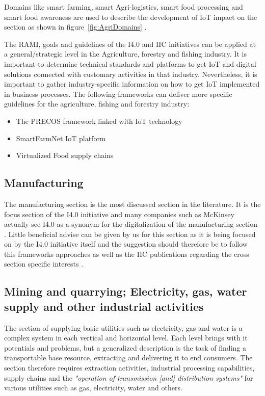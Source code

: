 Domains like smart farming, smart Agri-logistics, smart food processing and smart food awareness are used to describe the development of \ac{IoT} impact on the section as shown in figure~\ref{fig:AgriDomains} \cite[p.133]{FoodAndFarm2020}.

The \ac{RAMI}, goals and guidelines of the \ac{I4.0} and \ac{IIC} initiatives can be applied at a general/strategic level in the Agriculture, forestry and fishing industry. It is important to determine technical standards and platforms to get \ac{IoT} and digital solutions connected with customary activities in that industry. Nevertheless, it is important to gather industry-specific information on how to get \ac{IoT} implemented in business processes.
The following frameworks can deliver more specific guidelines for the agriculture, fishing and forestry industry:

\begin{itemize}
\item The PRECOS framework linked with \ac{IoT} technology \cite{Trolard2016590}
\item SmartFarmNet \ac{IoT} platform \cite{InternetOfThingsAgricultureSmartFarming}
\item Virtualized Food supply chains \cite{Verdouw2016128}
\end{itemize}


\subsection{Manufacturing}
The manufacturing section is the most discussed section in the literature. It is the focus section of the \ac{I4.0} initiative and many companies such as McKinsey actually see \ac{I4.0} as a synonym for the digitalization of the manufacturing section \cite[]{McKinseydigitizationIndustrialSector:2015}. Little beneficial advise can be given by us for this section as it is being focused on by the \ac{I4.0} initiative itself and the suggestion should therefore be to follow this frameworks approaches as well as the \ac{IIC} publications regarding the cross section specific interests \cite[]{iicarchitecture:2016}.

\subsection{Mining and quarrying; Electricity, gas, water supply and other industrial activities }

The section of supplying basic utilities such as electricity, gas and water is a complex system in each vertical and horizontal level. Each level brings with it potentials and problems, but a generalized description is the task of finding a transportable base resource, extracting and delivering it to end consumers. The section therefore requires extraction activities, industrial processing capabilities, supply chains and the \emph{"operation of transmission [and] distribution systems"}\cite[p. 166ff]{ISIC:2008} for various utilities such as gas, electricity, water and others.


